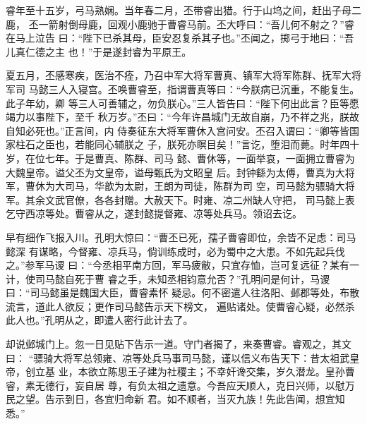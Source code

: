 睿年至十五岁，弓马熟娴。当年春二月，丕带睿出猎。行于山坞之间，赶出子母二鹿，
丕一箭射倒母鹿，回观小鹿驰于曹睿马前。丕大呼曰：“吾儿何不射之？”睿在马上泣告
曰：“陛下已杀其母，臣安忍复杀其子也。”丕闻之，掷弓于地曰：“吾儿真仁德之主
也！”于是遂封睿为平原王。

夏五月，丕感寒疾，医治不痊，乃召中军大将军曹真、镇军大将军陈群、抚军大将军司
马懿三人入寝宫。丕唤曹睿至，指谓曹真等曰：“今朕病已沉重，不能复生。此子年幼，卿
等三人可善辅之，勿负朕心。”三人皆告曰：“陛下何出此言？臣等愿竭力以事陛下，至千
秋万岁。”丕曰：“今年许昌城门无故自崩，乃不祥之兆，朕故自知必死也。”正言间，内
侍奏征东大将军曹休入宫问安。丕召入谓曰：“卿等皆国家柱石之臣也，若能同心辅朕之
子，朕死亦瞑目矣！”言讫，堕泪而薨。时年四十岁，在位七年。于是曹真、陈群、司马
懿、曹休等，一面举哀，一面拥立曹睿为大魏皇帝。谥父丕为文皇帝，谥母甄氏为文昭皇
后。封钟繇为太傅，曹真为大将军，曹休为大司马，华歆为太尉，王朗为司徒，陈群为司
空，司马懿为骠骑大将军。其余文武官僚，各各封赠。大赦天下。时雍、凉二州缺人守把，
司马懿上表乞守西凉等处。曹睿从之，遂封懿提督雍、凉等处兵马。领诏去讫。

早有细作飞报入川。孔明大惊曰：“曹丕已死，孺子曹睿即位，余皆不足虑：司马懿深
有谋略，今督雍、凉兵马，倘训练成时，必为蜀中之大患。不如先起兵伐之。”参军马谡
曰：“今丞相平南方回，军马疲敝，只宜存恤，岂可复远征？某有一计，使司马懿自死于曹
睿之手，未知丞相钧意允否？”孔明问是何计，马谡曰：“司马懿虽是魏国大臣，曹睿素怀
疑忌。何不密遣人往洛阳、邺郡等处，布散流言，道此人欲反；更作司马懿告示天下榜文，
遍贴诸处。使曹睿心疑，必然杀此人也。”孔明从之，即遣人密行此计去了。

却说邺城门上。忽一日见贴下告示一道。守门者揭了，来奏曹睿。睿观之，其文曰：
“骠骑大将军总领雍、凉等处兵马事司马懿，谨以信义布告天下：昔太祖武皇帝，创立基
业，本欲立陈思王子建为社稷主；不幸奸谗交集，岁久潜龙。皇孙曹睿，素无德行，妄自居
尊，有负太祖之遗意。今吾应天顺人，克日兴师，以慰万民之望。告示到日，各宜归命新
君。如不顺者，当灭九族！先此告闻，想宜知悉。”

